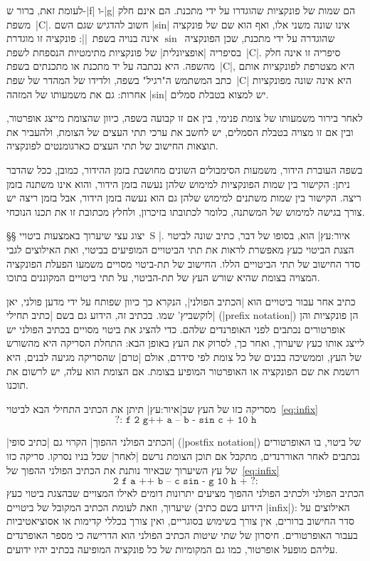 לעומת זאת, ברור ש-\T|f| ו-\T|g| הם שמות של פונקציות שהוגדרו על ידי מתכנת. הם
אינם חלק משפת~\E|C|. חשוב להדגיש שגם השם \T|sin| אינו שונה משני אלו, ואף הוא
שם של פונקציה שהוגדרה על ידי מתכנת, שכן הפונקציה~$\sin$ אינה בנויה
בשפת~\E|\CPL|: פונקציה זו מוגדרת בסיפריה \ע|אופציונלית| של פונקציות מתימטיות
הנספחת לשפת~\E|C|. סיפריה זו אינה חלק מהשפה. היא נכתבה על יד מתכנת או מתכנתים
בשפת~\E|C|, היא מצטרפת לפונקציות אותם כתב המשתמש ה"רגיל" בשפה, ולדידו של המהדר
של שפת~\E|C| היא אינה שונה מפונקציות אחרות: גם את משמעותו של המזהה \T|sin| יש
למצוא בטבלת סמלים.

לאחר בירור משמעותו של צומת פנימי, בין אם זו קבועה בשפה, כיוון שהצומת מייצג
אופרטור, ובין אם זו מצויה בטבלת הסמלים, יש לחשב את ערכי תתי העצים של הצומת,
ולהעביר את תוצאות החישוב של תתי העצים כארגומנטים לפונקציה.

בשפה העוברת הידור, משמעות הסימבולים השונים מחושבת בזמן ההידור, כמובן, ככל שהדבר
ניתן: הקישור בין שמות הפונקציות למימוש שלהן נעשה בזמן הידור, והוא אינו משתנה
בזמן ריצה. הקישור בין שמות משתנים למימוש שלהן גם הוא נעשה בזמן הידור, אבל בזמן
ריצה יש צורך בגישה למימוש של המשתנה, כלומר לכתובתו בזיכרון, ולחלץ מכתובת זו את
תכנו הנוכחי.

§§ יצוג עצי שיערוך באמצעות ביטויי~S
|איור:עץ| הוא, בסופו של דבר, כתיב שונה לביטוי . הצגת הביטוי כעץ מאפשרת לראות את תתי הביטויים המופיעים
בביטוי, ואת האילוצים לגבי סדר החישוב של תתי הביטויים הללו. החישוב של תת-ביטוי
מסויים משמעו הפעלת הפונקציה המצויה בצומת שהיא שורש העץ של תת-הביטוי, על תתי ביטויים
המקוננים בתוכו.

כתיב אחר עבור ביטויים הוא \ע|הכתיב הפולני|, הנקרא כך כיוון שפותח על ידי מדען
פולני, יאן לוקשביץ' שמו. בכתיב זה, הידוע גם בשם \ע|כתיב תחילי| (\E|prefix
notation|) הן פונקציות והן אופרטורים נכתבים לפני האופרנדים שלהם. כדי להציג את
ביטוי מסויים בכתיב הפולני יש לייצג אותו כעץ שיערוך, ואחר כך, לסרוק את העץ באופן
הבא: התחלת הסריקה היא מהשורש של העץ, וממשיכה בבנים של כל צומת לפי סידרם, אולם
\ע|טרם| שהסריקה מגיעה לבנים, היא רושמת את שם הפונקציה או האופרטור המופיע בצומת.
אם הצומת הוא עלה, יש לרשום את תוכנו.

מסריקה כזו של העץ שב|איור:עץ| תיתן את הכתיב התחילי הבא
לביטוי~\ref{eq:infix}
\begin{equation}
  \label{eq:prefix}
  \texttt{?:~f~2 g++~a~--~b~- sin c~+~10 h}
\end{equation}

\ע|הכתיב הפולני ההפוך| הקרוי גם \ע|כתיב סופי| (\E|postfix notation|) של ביטוי, בו
האופרטורים נכתבים לאחר האוררנדים, מתקבל אם תוכן הצומת נרשם \ע|לאחר| שכל בניו
נסרקו. סריקה כזו של עץ השיערוך שבאיור נותנת את הכתיב הפולני ההפוך
של~\ref{eq:infix}
\begin{equation}
  \label{eq:postfix}
  \texttt{2~f~a~++~b~--~c~sin~-~g~10~h~+~?:}
\end{equation}
הכתיב הפולני ולכתיב הפולני ההפוך מציעים יתרונות דומים לאילו המצויים שבהצגת
ביטוי כעץ שיערוך, וזאת לעומת הכתיב המקובל של ביטויים (הידוע בשם כתיב \E|infix|):
האילוצים על סדר החישוב ברורים, אין צורך בשימוש בסוגריים, ואין צורך בכללי קדימות
או אסוציאטיביות בעבור האופרטורים.
חיסרון של שתי שיטות הכתיב הפולני הוא הדרישה כי מספר האופרנדים עליהם מופעל
אופרטור, כמו גם המקומיות של כל פונקציה המופיעה בכתיב יהיו ידועים.

